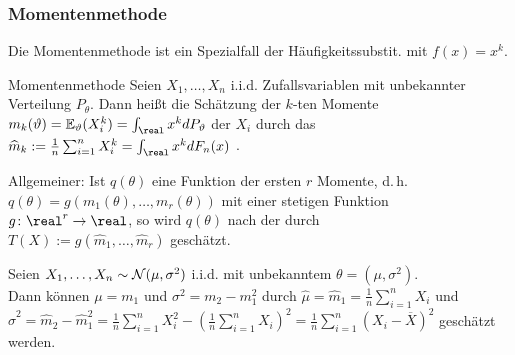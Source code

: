 \pagebreak

\subsubsection{%
    Momentenmethode%
}

\begin{Bem}
    Die Momentenmethode ist ein Spezialfall der Häufigkeitssubstit. mit $f(x) = x^k$.
\end{Bem}

\begin{Def}{Momentenmethode}
    Seien $X_1, \dotsc, X_n$ i.i.d. Zufallsvariablen mit unbekannter Verteilung $P_\theta$.
    Dann heißt die Schätzung der $k$-ten Momente
    $m_k(\theta) = \EE_\theta(X_i^k) = \int_\real x^k dP_\theta$ der $X_i$ durch
    das 
    $\widehat{m}_k := \frac{1}{n} \sum_{i=1}^n X_i^k = \int_\real x^k dF_n(x)$
    .

    Allgemeiner:
    Ist $q(\theta)$ eine Funktion der ersten $r$ Momente, d.\,h.
    $q(\theta) = g(m_1(\theta), \dotsc, m_r(\theta))$ mit einer stetigen Funktion
    $g\colon \real^r \rightarrow \real$,
    so wird $q(\theta)$ nach der  durch\\
    $T(X) := g(\widehat{m}_1, \dotsc, \widehat{m}_r)$ geschätzt.
\end{Def}

\linie

\begin{Bsp}
    Seien $X_1, \dotsc, X_n \sim \mathcal{N}(\mu, \sigma^2)$ i.i.d. mit unbekanntem
    $\theta = (\mu, \sigma^2)$.\\
    Dann können $\mu = m_1$ und $\sigma^2 = m_2 - m_1^2$ durch
    $\widehat{\mu} = \widehat{m}_1 = \frac{1}{n} \sum_{i=1}^n X_i$ und\\
    $\widehat{\sigma}^2 = \widehat{m}_2 - \widehat{m}_1^2 =
    \frac{1}{n} \sum_{i=1}^n X_i^2 - \left(\frac{1}{n} \sum_{i=1}^n X_i\right)^2
    = \frac{1}{n} \sum_{i=1}^n (X_i - \overline{X})^2$ geschätzt werden.
\end{Bsp}

